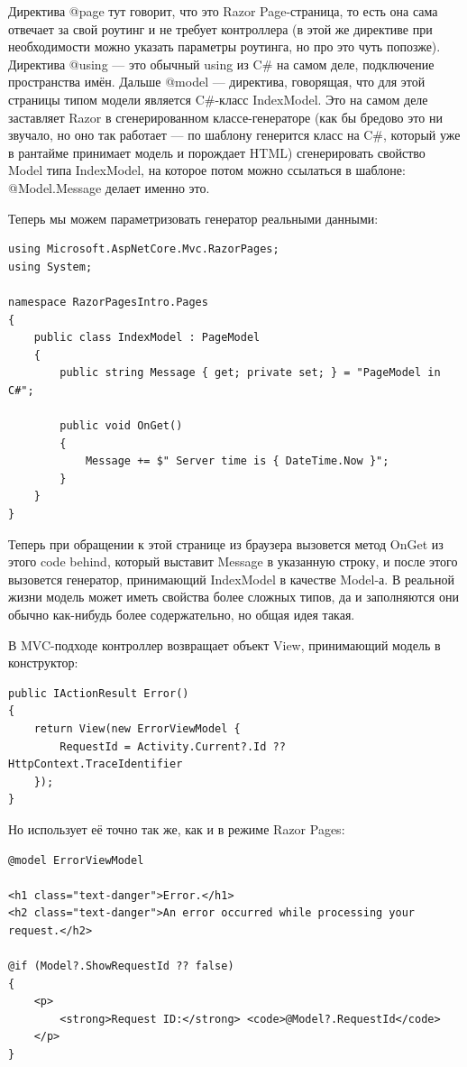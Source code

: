 \documentclass{../../text-style}
\begin{document}
Директива @page тут говорит, что это Razor Page-страница, то есть она сама отвечает за свой роутинг и не требует контроллера (в этой же директиве при необходимости можно указать параметры роутинга, но про это чуть попозже). Директива @using --- это обычный using из C\# на самом деле, подключение пространства имён. Дальше @model --- директива, говорящая, что для этой страницы типом модели является C\#-класс IndexModel. Это на самом деле заставляет Razor в сгенерированном классе-генераторе (как бы бредово это ни звучало, но оно так работает --- по шаблону генерится класс на C\#, который уже в рантайме принимает модель и порождает HTML) сгенерировать свойство Model типа IndexModel, на которое потом можно ссылаться в шаблоне: @Model.Message делает именно это.

Теперь мы можем параметризовать генератор реальными данными:

\begin{verbatim}
using Microsoft.AspNetCore.Mvc.RazorPages;
using System;

namespace RazorPagesIntro.Pages
{
    public class IndexModel : PageModel
    {
        public string Message { get; private set; } = "PageModel in C#";

        public void OnGet()
        {
            Message += $" Server time is { DateTime.Now }";
        }
    }
}
\end{verbatim}

Теперь при обращении к этой странице из браузера вызовется метод OnGet из этого code behind, который выставит Message в указанную строку, и после этого вызовется генератор, принимающий IndexModel в качестве Model-а. В реальной жизни модель может иметь свойства более сложных типов, да и заполняются они обычно как-нибудь более содержательно, но общая идея такая. 

В MVC-подходе контроллер возвращает объект View, принимающий модель в конструктор:

\begin{verbatim}
public IActionResult Error()
{
    return View(new ErrorViewModel { 
        RequestId = Activity.Current?.Id ?? HttpContext.TraceIdentifier 
    });
}
\end{verbatim}

Но использует её точно так же, как и в режиме Razor Pages:

\begin{verbatim}
@model ErrorViewModel

<h1 class="text-danger">Error.</h1>
<h2 class="text-danger">An error occurred while processing your request.</h2>

@if (Model?.ShowRequestId ?? false)
{
    <p>
        <strong>Request ID:</strong> <code>@Model?.RequestId</code>
    </p>
}
\end{verbatim}
\end{document}
